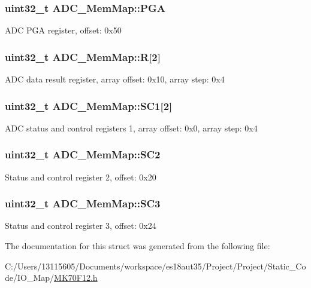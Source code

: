 \subsubsection[{P\+G\+A}]{\setlength{\rightskip}{0pt plus 5cm}uint32\+\_\+t A\+D\+C\+\_\+\+Mem\+Map\+::\+P\+G\+A}\label{struct_a_d_c___mem_map_a3c43d657acb03daee1a6abbb58206a56}
A\+D\+C P\+G\+A register, offset\+: 0x50 \hypertarget{struct_a_d_c___mem_map_acbd8ded0e3f30d8502e9b9229e092fe8}{}
\subsubsection[{R}]{\setlength{\rightskip}{0pt plus 5cm}uint32\+\_\+t A\+D\+C\+\_\+\+Mem\+Map\+::\+R\mbox{[}2\mbox{]}}\label{struct_a_d_c___mem_map_acbd8ded0e3f30d8502e9b9229e092fe8}
A\+D\+C data result register, array offset\+: 0x10, array step\+: 0x4 \hypertarget{struct_a_d_c___mem_map_ab3900b4bfe889cd9d04850d121394741}{}
\subsubsection[{S\+C1}]{\setlength{\rightskip}{0pt plus 5cm}uint32\+\_\+t A\+D\+C\+\_\+\+Mem\+Map\+::\+S\+C1\mbox{[}2\mbox{]}}\label{struct_a_d_c___mem_map_ab3900b4bfe889cd9d04850d121394741}
A\+D\+C status and control registers 1, array offset\+: 0x0, array step\+: 0x4 \hypertarget{struct_a_d_c___mem_map_ad7caff2bf5e2dfb2159d174af24dc693}{}
\subsubsection[{S\+C2}]{\setlength{\rightskip}{0pt plus 5cm}uint32\+\_\+t A\+D\+C\+\_\+\+Mem\+Map\+::\+S\+C2}\label{struct_a_d_c___mem_map_ad7caff2bf5e2dfb2159d174af24dc693}
Status and control register 2, offset\+: 0x20 \hypertarget{struct_a_d_c___mem_map_a68295218c104f78bc2b11f04c06ce55e}{}
\subsubsection[{S\+C3}]{\setlength{\rightskip}{0pt plus 5cm}uint32\+\_\+t A\+D\+C\+\_\+\+Mem\+Map\+::\+S\+C3}\label{struct_a_d_c___mem_map_a68295218c104f78bc2b11f04c06ce55e}
Status and control register 3, offset\+: 0x24 

The documentation for this struct was generated from the following file\+:\begin{DoxyCompactItemize}
\item 
C\+:/\+Users/13115605/\+Documents/workspace/es18aut35/\+Project/\+Project/\+Static\+\_\+\+Code/\+I\+O\+\_\+\+Map/\hyperlink{_m_k70_f12_8h}{M\+K70\+F12.\+h}\end{DoxyCompactItemize}
